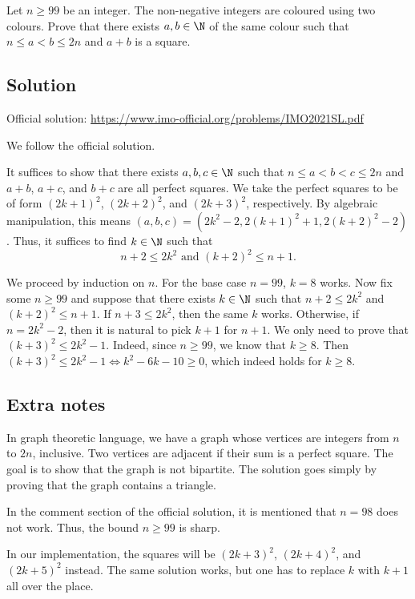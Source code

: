 Let $n \geq 99$ be an integer.
The non-negative integers are coloured using two colours.
Prove that there exists $a, b \in \N$ of the same colour such that $n \leq a < b \leq 2n$ and $a + b$ is a square.


\subsection*{Solution}

Official solution: \url{https://www.imo-official.org/problems/IMO2021SL.pdf}

We follow the official solution.

It suffices to show that there exists $a, b, c \in \N$ such that $n \leq a < b < c \leq 2n$ and $a + b$, $a + c$, and $b + c$ are all perfect squares.
We take the perfect squares to be of form $(2k + 1)^2$, $(2k + 2)^2$, and $(2k + 3)^2$, respectively.
By algebraic manipulation, this means $(a, b, c) = (2k^2 - 2, 2(k + 1)^2 + 1, 2(k + 2)^2 - 2)$.
Thus, it suffices to find $k \in \N$ such that
\[ n + 2 \leq 2k^2 \text{ and } (k + 2)^2 \leq n + 1. \]

We proceed by induction on $n$.
For the base case $n = 99$, $k = 8$ works.
Now fix some $n \geq 99$ and suppose that there exists $k \in \N$ such that $n + 2 \leq 2k^2$ and $(k + 2)^2 \leq n + 1$.
If $n + 3 \leq 2k^2$, then the same $k$ works.
Otherwise, if $n = 2k^2 - 2$, then it is natural to pick $k + 1$ for $n + 1$.
We only need to prove that $(k + 3)^2 \leq 2k^2 - 1$.
Indeed, since $n \geq 99$, we know that $k \geq 8$.
Then $(k + 3)^2 \leq 2k^2 - 1 \iff k^2 - 6k - 10 \geq 0$, which indeed holds for $k \geq 8$.



\subsection*{Extra notes}

In graph theoretic language, we have a graph whose vertices are integers from $n$ to $2n$, inclusive.
Two vertices are adjacent if their sum is a perfect square.
The goal is to show that the graph is not bipartite.
The solution goes simply by proving that the graph contains a triangle.

In the comment section of the official solution, it is mentioned that $n = 98$ does not work.
Thus, the bound $n \geq 99$ is sharp.

In our implementation, the squares will be $(2k + 3)^2$, $(2k + 4)^2$, and $(2k + 5)^2$ instead.
The same solution works, but one has to replace $k$ with $k + 1$ all over the place.
